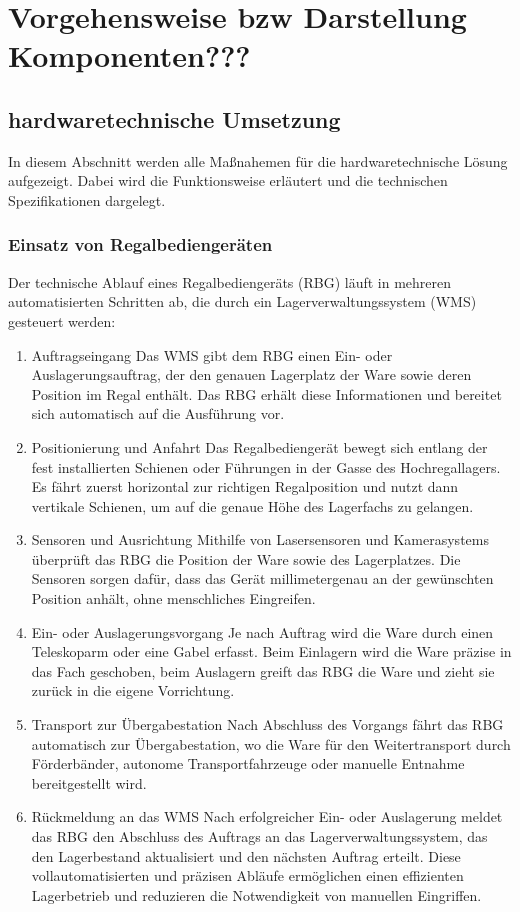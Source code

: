 \chapter{Vorgehensweise bzw Darstellung Komponenten???}

\section{hardwaretechnische Umsetzung}
In diesem Abschnitt werden alle Maßnahemen für die hardwaretechnische Lösung aufgezeigt. Dabei wird die Funktionsweise erläutert und die technischen Spezifikationen dargelegt.
\subsection{Einsatz von Regalbediengeräten}

Der technische Ablauf eines Regalbediengeräts (RBG) läuft in mehreren automatisierten Schritten ab, die durch ein Lagerverwaltungssystem (WMS) gesteuert werden:
\begin{enumerate}
\item Auftragseingang
Das WMS gibt dem RBG einen Ein- oder Auslagerungsauftrag, der den genauen Lagerplatz der Ware sowie deren Position im Regal enthält. Das RBG erhält diese Informationen und bereitet sich automatisch auf die Ausführung vor.
\item Positionierung und Anfahrt
Das Regalbediengerät bewegt sich entlang der fest installierten Schienen oder Führungen in der Gasse des Hochregallagers. Es fährt zuerst horizontal zur richtigen Regalposition und nutzt dann vertikale Schienen, um auf die genaue Höhe des Lagerfachs zu gelangen.
\item Sensoren und Ausrichtung
Mithilfe von Lasersensoren und Kamerasystems überprüft das RBG die Position der Ware sowie des Lagerplatzes. Die Sensoren sorgen dafür, dass das Gerät millimetergenau an der gewünschten Position anhält, ohne menschliches Eingreifen.
\item Ein- oder Auslagerungsvorgang
Je nach Auftrag wird die Ware durch einen Teleskoparm oder eine Gabel erfasst. Beim Einlagern wird die Ware präzise in das Fach geschoben, beim Auslagern greift das RBG die Ware und zieht sie zurück in die eigene Vorrichtung.
\item Transport zur Übergabestation
Nach Abschluss des Vorgangs fährt das RBG automatisch zur Übergabestation, wo die Ware für den Weitertransport durch Förderbänder, autonome Transportfahrzeuge oder manuelle Entnahme bereitgestellt wird.
\item Rückmeldung an das WMS
Nach erfolgreicher Ein- oder Auslagerung meldet das RBG den Abschluss des Auftrags an das Lagerverwaltungssystem, das den Lagerbestand aktualisiert und den nächsten Auftrag erteilt.
Diese vollautomatisierten und präzisen Abläufe ermöglichen einen effizienten Lagerbetrieb und reduzieren die Notwendigkeit von manuellen Eingriffen.
\end{enumerate}

